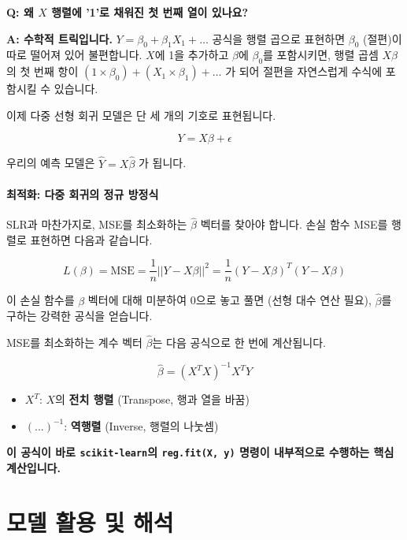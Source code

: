 \documentclass[11pt,a4paper]{book}
\theoremstyle{definition}
\begin{document}
\begin{warningbox}
\textbf{Q: 왜 $X$ 행렬에 '1'로 채워진 첫 번째 열이 있나요?}

\textbf{A: 수학적 트릭입니다.}
$Y = \beta_0 + \beta_1 X_1 + \dots$ 공식을 행렬 곱으로 표현하면 $\beta_0$ (절편)이 따로 떨어져 있어 불편합니다.
$X$에 1을 추가하고 $\beta$에 $\beta_0$를 포함시키면, 행렬 곱셈 $X\beta$의 첫 번째 항이
$(1 \times \beta_0) + (X_1 \times \beta_1) + \dots$ 가 되어 절편을 자연스럽게 수식에 포함시킬 수 있습니다.
\end{warningbox}

이제 다중 선형 회귀 모델은 단 세 개의 기호로 표현됩니다.

$$ Y = X\beta + \epsilon $$

우리의 예측 모델은 $\hat{Y} = X\hat{\beta}$ 가 됩니다.

\subsection{최적화: 다중 회귀의 정규 방정식}

SLR과 마찬가지로, MSE를 최소화하는 $\hat{\beta}$ 벡터를 찾아야 합니다.
손실 함수 MSE를 행렬로 표현하면 다음과 같습니다.

$$ L(\beta) = \text{MSE} = \frac{1}{n} ||Y - X\beta||^2 = \frac{1}{n} (Y - X\beta)^T (Y - X\beta) $$

이 손실 함수를 $\beta$ 벡터에 대해 미분하여 0으로 놓고 풀면 (선형 대수 연산 필요), $\hat{\beta}$를 구하는 강력한 공식을 얻습니다.

\begin{tcolorbox}[title={다중 선형 회귀의 정규 방정식 (The Normal Equation)}]
MSE를 최소화하는 계수 벡터 $\hat{\beta}$는 다음 공식으로 한 번에 계산됩니다.

$$ \hat{\beta} = (X^T X)^{-1} X^T Y $$

\begin{itemize}
    \item $X^T$: $X$의 \textbf{전치 행렬} (Transpose, 행과 열을 바꿈)
    \item $(...)^{-1}$: \textbf{역행렬} (Inverse, 행렬의 나눗셈)
\end{itemize}
\textbf{이 공식이 바로 \texttt{scikit-learn}의 \texttt{reg.fit(X, y)} 명령이 내부적으로 수행하는 핵심 계산입니다.}
\end{tcolorbox}

\part{모델 활용 및 해석}
\end{document}
